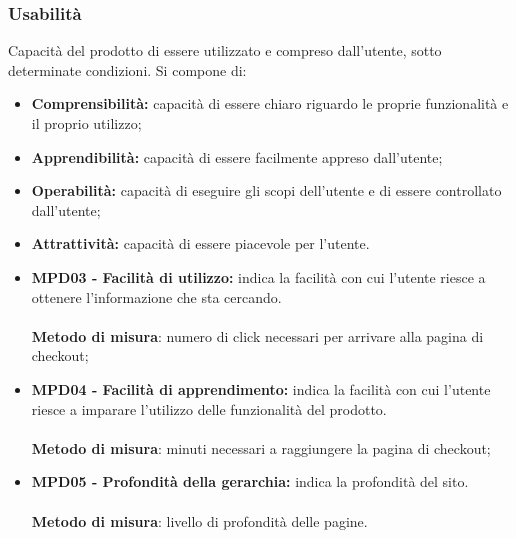 \subsubsection{Usabilità}
Capacità del prodotto di essere utilizzato e compreso dall'utente, sotto determinate condizioni. Si compone di:
\begin{itemize}
    \item \textbf{Comprensibilità: }capacità di essere chiaro riguardo le proprie funzionalità e il proprio utilizzo;
    \item \textbf{Apprendibilità: }capacità di essere facilmente appreso dall'utente;
    \item \textbf{Operabilità: }capacità di eseguire gli scopi dell'utente e di essere controllato dall'utente;
    \item \textbf{Attrattività: }capacità di essere piacevole per l'utente.
\end{itemize}
\begin{itemize}
    \item \textbf{MPD03 - Facilità di utilizzo:} indica la facilità con cui l'utente riesce a ottenere l'informazione che sta cercando.\\
          \\\textbf{Metodo di misura}: numero di click necessari per arrivare alla pagina di checkout;
    \item \textbf{MPD04 - Facilità di apprendimento:} indica la facilità con cui l'utente riesce a imparare l'utilizzo delle funzionalità del prodotto.\\
          \\\textbf{Metodo di misura}: minuti necessari a raggiungere la pagina di checkout;
    \item \textbf{MPD05 - Profondità della gerarchia:} indica la profondità del sito.\\
          \\\textbf{Metodo di misura}: livello di profondità delle pagine.
\end{itemize}
